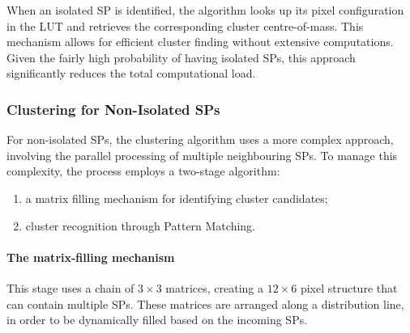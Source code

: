 When an isolated SP is identified, the algorithm looks up its pixel configuration in the LUT and retrieves the corresponding cluster centre-of-mass. 
This mechanism allows for efficient cluster finding without extensive computations. Given the fairly high probability of having isolated SPs, this approach significantly reduces the total computational load.

\subsubsection{Clustering for Non-Isolated SPs}
For non-isolated SPs, the clustering algorithm uses a more complex approach, involving the parallel processing of multiple neighbouring SPs. To manage this complexity, the process employs a two-stage algorithm\cite{Lazzari:2813167}:
\begin{samepage}
\begin{enumerate}
    \item a matrix filling mechanism for identifying cluster candidates;
    \item cluster recognition through Pattern Matching.
\end{enumerate}
\end{samepage}
\paragraph{The matrix-filling mechanism}
This stage uses a chain of $3\times3$ matrices, creating a $12\times6$ pixel structure that can contain multiple SPs. These matrices are arranged along a distribution line, in order to be dynamically filled based on the incoming SPs.

